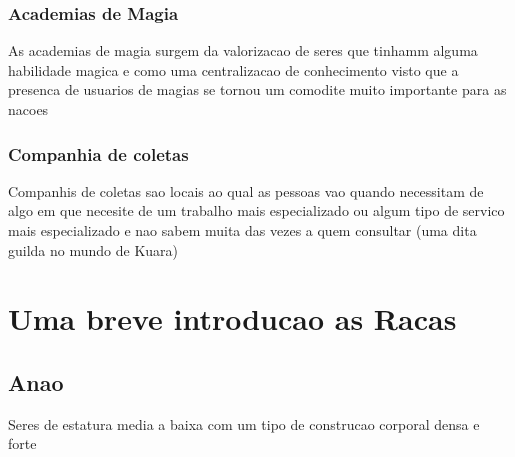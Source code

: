 \documentclass{book}
\begin{document}
\section*{Academias de Magia}    
As academias de magia surgem da valorizacao de seres que tinhamm alguma habilidade magica 
e como uma centralizacao de conhecimento visto que a presenca de usuarios de magias se 
tornou um comodite muito importante para as nacoes
\section*{Companhia de coletas}
Companhis de coletas sao locais ao qual as pessoas vao quando necessitam de algo em que 
necesite de um trabalho mais especializado ou algum tipo de servico mais especializado
e nao sabem muita das vezes a quem consultar (uma dita guilda no mundo de Kuara)

\part{Uma breve introducao as Racas}

\chapter{Anao}
 

Seres de estatura media a baixa com um tipo de construcao corporal densa e forte 
\end{document}
